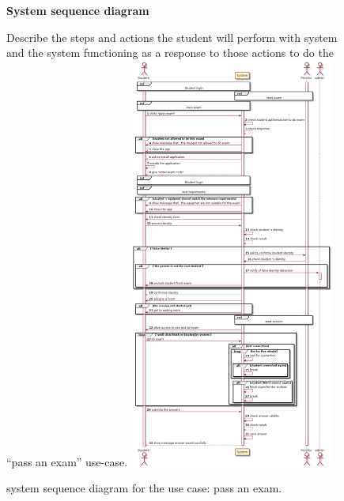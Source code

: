\documentclass[]{uc2pfecaneva}
\begin{document}
    \begin{figure}
        \raggedright\textbf{System sequence diagram}\linebreak
        \raggedright{Describe the steps and actions the student will perform with system and the system functioning
        as a response to those actions to do the “pass an exam” use-case.}
        \includegraphics[width=0.6\textwidth]{images/pass_exam}

        \caption{system sequence diagram for the use case: pass an exam.}
    \end{figure}
    \clearpage
\end{document}
